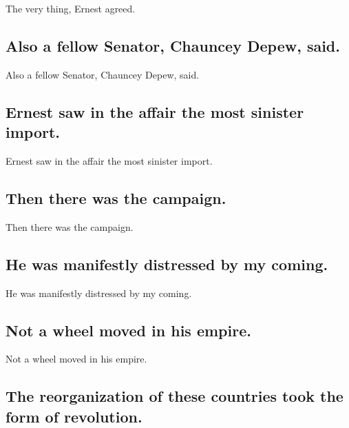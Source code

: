 \documentclass[]{article}
\begin{document}
The very thing, Ernest agreed.

\hypertarget{also-a-fellow-senator-chauncey-depew-said.}{%
\subsection{Also a fellow Senator, Chauncey Depew,
said.}\label{also-a-fellow-senator-chauncey-depew-said.}}

Also a fellow Senator, Chauncey Depew, said.

\hypertarget{ernest-saw-in-the-affair-the-most-sinister-import.}{%
\subsection{Ernest saw in the affair the most sinister
import.}\label{ernest-saw-in-the-affair-the-most-sinister-import.}}

Ernest saw in the affair the most sinister import.

\hypertarget{then-there-was-the-campaign.}{%
\subsection{Then there was the
campaign.}\label{then-there-was-the-campaign.}}

Then there was the campaign.

\hypertarget{he-was-manifestly-distressed-by-my-coming.}{%
\subsection{He was manifestly distressed by my
coming.}\label{he-was-manifestly-distressed-by-my-coming.}}

He was manifestly distressed by my coming.

\hypertarget{not-a-wheel-moved-in-his-empire.}{%
\subsection{Not a wheel moved in his
empire.}\label{not-a-wheel-moved-in-his-empire.}}

Not a wheel moved in his empire.

\hypertarget{the-reorganization-of-these-countries-took-the-form-of-revolution.}{%
\subsection{The reorganization of these countries took the form of
revolution.}\label{the-reorganization-of-these-countries-took-the-form-of-revolution.}}
\end{document}
